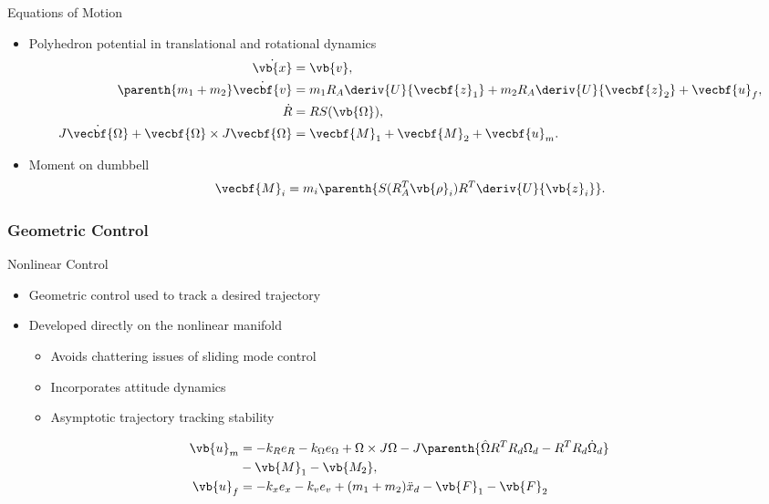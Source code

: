 \begin{frame}{Equations of Motion}

    \begin{itemize}
        \item Polyhedron potential in translational and rotational dynamics
        \begin{align*}
            \dot{\vb{x}} &= \vb{v}, \\
            \parenth{m_1 + m_2} \dot{\vecbf{v}} &= m_1 R_A \deriv{U}{\vecbf{z}_1} + m_2 R_A \deriv{U}{\vecbf{z}_2} + \vecbf{u}_f, \\
            \dot{R} &= R S(\vb{\Omega}) , \\
            J \dot{\vecbf{\Omega}} + \vecbf{\Omega} \times J \vecbf{\Omega} &= \vecbf{M}_1 + \vecbf{M}_2 + \vecbf{u}_m. 
        \end{align*}
    \item Moment on dumbbell
        \begin{align*}
            \vecbf{M}_i = m_i \parenth{S(R_A^T \vb{\rho}_i) R^T \deriv{U}{\vb{z}_i}}.
        \end{align*}
    \end{itemize}
\end{frame}

\subsubsection[Geometric Control]{Geometric Control}

\begin{frame}{Nonlinear Control}
    \begin{itemize}
        \item Geometric control used to track a desired trajectory
        \item Developed directly on the nonlinear manifold
            \begin{itemize}
                \item Avoids chattering issues of sliding mode control
                \item Incorporates attitude dynamics
                \item Asymptotic trajectory tracking stability
            \end{itemize}
    \end{itemize}

\pause
\begin{align*}
    \vb{u}_m &= - k_R e_R - k_\Omega e_\Omega + \Omega \times J \Omega - J \parenth{\hat{\Omega} R^T R_d \Omega_d - R^T R_d \dot{\Omega}_d}  \\
             &- \vb{M}_1 - \vb{M_2} , \\
    \vb{u}_f &= - k_x e_x  - k_v e_v + ( m_1  + m_2 ) \ddot{x}_d - \vb{F}_1 - \vb{F}_2 
\end{align*}
\end{frame}

